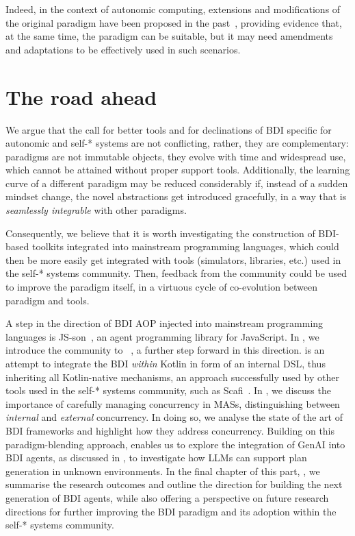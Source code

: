 Indeed, in the context of autonomic computing,
extensions and modifications of the original paradigm have been proposed in the past~\cite{DBLP:conf/smc/JunJZBCJ04,DBLP:conf/prima/LiaoJG06,DBLP:journals/symmetry/KaradumanTC22},
providing evidence that, at the same time,
the paradigm can be suitable, but it may need amendments and adaptations to be effectively used in such scenarios.

\section{The road ahead}

We argue that the call for better tools
and for declinations of \ac{BDI} specific for autonomic and self-* systems are not conflicting,
rather, they are complementary:
paradigms are not immutable objects, they evolve with time and widespread use,
which cannot be attained without proper support tools.
%
Additionally,
the learning curve of a different paradigm may be reduced considerably if,
instead of a sudden mindset change,
the novel abstractions get introduced gracefully, in a way that is \emph{seamlessly integrable}
with other paradigms.

Consequently,
we believe that it is worth investigating the construction of \ac{BDI}-based toolkits
integrated into mainstream programming languages,
which could then be more easily get integrated with tools
(simulators, libraries, etc.)
used in the self-* systems community.
%
Then, feedback from the community could be used to improve the paradigm itself,
in a virtuous cycle of co-evolution between paradigm and tools.

A step in the direction of \ac{BDI} \ac{AOP} injected into mainstream programming languages is
JS-son~\cite{DBLP:conf/emas/KampikN19},
an agent programming library for JavaScript.
%
In ,
we introduce the community to \jakta{}~\cite{BaiardiBCP23},
a further step forward in this direction.
%
\jakta{} is an attempt to integrate the \ac{BDI} \emph{within} Kotlin
in form of an internal \ac{DSL},
thus inheriting all Kotlin-native mechanisms,
an approach successfully used by other tools used in the self-* systems community, such as Scafi~\cite{DBLP:journals/softx/CasadeiVAP22}.
%
In ,
we discuss the importance of carefully managing concurrency in \acp{MAS},
distinguishing between \emph{internal} and \emph{external} concurrency.
%
In doing so, we analyse the state of the art of \ac{BDI} frameworks and highlight how they address concurrency.
%
Building on this paradigm-blending approach, 
\jakta{} enables us to explore the integration of \ac{GenAI} into \ac{BDI} agents,
as discussed in ,
to investigate how \acp{LLM} can support plan generation in unknown environments.
%
In the final chapter of this part, ,
we summarise the research outcomes and outline the direction for building the next generation of \ac{BDI} agents,
while also offering a perspective on future research directions for further improving the \ac{BDI} paradigm and its adoption within the self-* systems community.

